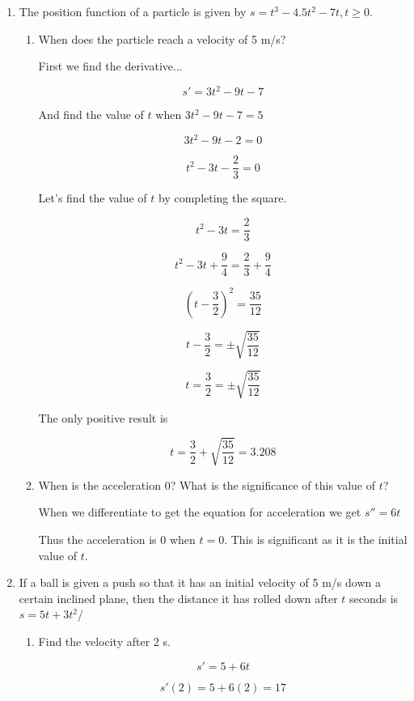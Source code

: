 \documentclass{article}
\begin{document}
\begin{enumerate}

		\item The position function of a particle is given by $s = t^3 - 4.5t^2 - 7t, t \geq 0$.

			\begin{enumerate}
				\item When does the particle reach a velocity of 5 m/s?

				First we find the derivative...

				$$s' = 3t^2 - 9t -7$$

				And find the value of $t$ when $3t^2 - 9t - 7 = 5$

				$$3t^2 - 9t - 2 = 0$$

				$$t^2 - 3t - \frac{2}{3} = 0$$

				Let's find the value of $t$ by completing the square.

				$$t^2 - 3t = \frac{2}{3}$$

				$$t^2 - 3t + \frac{9}{4} = \frac{2}{3} + \frac{9}{4}$$

				$$(t - \frac{3}{2})^2 = \frac{35}{12}$$

				$$t - \frac{3}{2} = \pm \sqrt{\frac{35}{12}}$$

				$$t = \frac{3}{2} = \pm \sqrt{\frac{35}{12}}$$

				The only positive result is

				$$t = \frac{3}{2} + \sqrt{\frac{35}{12}} = 3.208$$

				\item When is the acceleration 0? What is the significance
					of this value of $t$?

					When we differentiate to get the equation for acceleration
					we get $s'' = 6t$

					Thus the acceleration is 0 when $t = 0$. This is significant
					as it is the initial value of $t$.
			\end{enumerate}

			\item If a ball is given a push so that it has an initial velocity of 5 m/s
				down a certain inclined plane, then the distance it has rolled down
				after $t$ seconds is $s = 5t + 3t^2$/

			\begin{enumerate}
				\item Find the velocity after 2 s.

				$$s' = 5 + 6t$$

				$$s'(2) = 5 + 6(2) = 17$$


\end{enumerate}
\end{enumerate}
\end{document}

